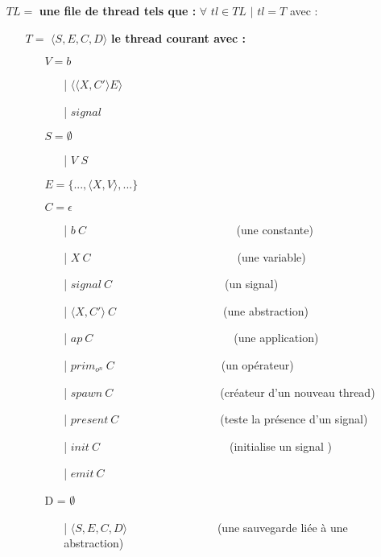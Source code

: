 \documentclass[10pt,a4paper]{article}
\begin{document}
				\begin{itemize}
					\item[] $TL =$ \textbf{une file de thread tels que :} $\forall$ $tl \in TL$ $|$ $tl = T$ avec :
					\begin{itemize}
						\item[] $T =$ $\langle S,E,C,D\rangle$ \textbf{le thread courant avec :}
						\begin{itemize}
							\item[] $V = b$	
							\begin{itemize}
								\item[|] $\langle\langle X,C' \rangle E\rangle$
								\item[|] $signal$
							\end{itemize}
							\item[] $S =  \emptyset$ 
							\begin{itemize}
								\item[|] $V$ $S$
							\end{itemize}
							\item[] $E = \{...,\langle X,V\rangle,...\}$
							\item[] $C = \epsilon$								
							\begin{itemize}
								\item[|] $b~C$~~~~~~~~~~~~~~~~~~~~~~~~~~    (une constante)
								\item[|] $X~C$~~~~~~~~~~~~~~~~~~~~~~~~~~(une variable)
								\item[|] $signal~C$~~~~~~~~~~~~~~~~~~~~(un signal)
								\item[|] $\langle X,C'\rangle~C$~~~~~~~~~~~~~~~~~~~(une abstraction)
								\item[|] $ap~C$~~~~~~~~~~~~~~~~~~~~~~~~~(une application)
								\item[|] $prim_{o^{n}}~C$~~~~~~~~~~~~~~~~~~~(un opérateur)
								\item[|] $spawn~C$~~~~~~~~~~~~~~~~~~~(créateur d'un nouveau thread)
								\item[|] $present~C$~~~~~~~~~~~~~~~~~~(teste la présence d'un signal)
								\item[|] $init~C$~~~~~~~~~~~~~~~~~~~~~~~(initialise un signal )
								\item[|] $emit~C$
							\end{itemize}
							\item[] D = $\emptyset$
							\begin{itemize}
								\item[|] $\langle S,E,C,D\rangle$~~~~~~~~~~~~~~~~(une sauvegarde liée à une abstraction)

\end{itemize}
\end{itemize}
\end{itemize}
\end{itemize}
\end{document}
